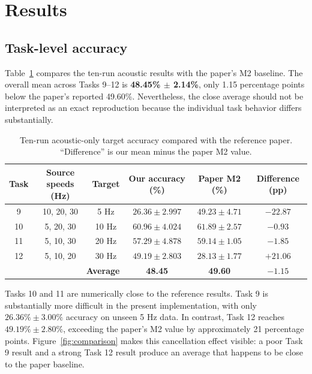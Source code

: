 \documentclass[10pt,a4paper,twocolumn]{article}
\newcommand{\ours}{\textbf{48.45\% $\pm$ 2.14\%}}
\begin{document}
\section{Results}

\subsection{Task-level accuracy}

Table~\ref{tab:results} compares the ten-run acoustic results with the paper's M2 baseline. The overall mean across Tasks 9--12 is \ours, only 1.15 percentage points below the paper's reported 49.60\%. Nevertheless, the close average should not be interpreted as an exact reproduction because the individual task behavior differs substantially.

\begin{table}[!t]
\centering
\caption{Ten-run acoustic-only target accuracy compared with the reference paper. ``Difference'' is our mean minus the paper M2 value.}
\label{tab:results}
\small
\begin{tabular}{c c c c c c}
\toprule
\textbf{Task} & \textbf{Source speeds (Hz)} & \textbf{Target} & \textbf{Our accuracy (\%)} & \textbf{Paper M2 (\%)} & \textbf{Difference (pp)}\\
\midrule
9  & 10, 20, 30 & 5 Hz  & $26.36\pm2.997$ & $49.23\pm4.71$ & $-22.87$\\
10 & 5, 20, 30  & 10 Hz & $60.96\pm4.024$ & $61.89\pm2.57$ & $-0.93$\\
11 & 5, 10, 30  & 20 Hz & $57.29\pm4.878$ & $59.14\pm1.05$ & $-1.85$\\
12 & 5, 10, 20  & 30 Hz & $49.19\pm2.803$ & $28.13\pm1.77$ & $+21.06$\\
\midrule
\multicolumn{3}{r}{\textbf{Average}} & \textbf{48.45} & \textbf{49.60} & \textbf{$-1.15$}\\
\bottomrule
\end{tabular}
\end{table}

Tasks 10 and 11 are numerically close to the reference results. Task 9 is substantially more difficult in the present implementation, with only $26.36\%\pm3.00\%$ accuracy on unseen 5 Hz data. In contrast, Task 12 reaches $49.19\%\pm2.80\%$, exceeding the paper's M2 value by approximately 21 percentage points. Figure~\ref{fig:comparison} makes this cancellation effect visible: a poor Task 9 result and a strong Task 12 result produce an average that happens to be close to the paper baseline.
\end{document}
